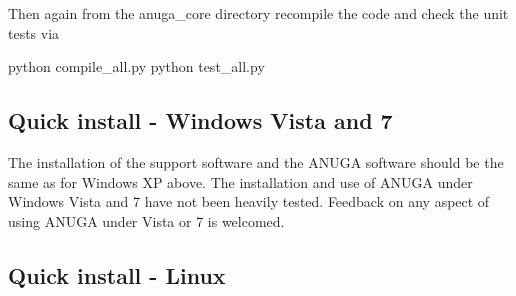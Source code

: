\documentclass{manual}
\begin{document}
Then again from the anuga_core directory recompile the code and check the unit tests via

python compile_all.py
python test_all.py




%




\subsection{Quick install - Windows Vista and 7}
\label{sec:winvista}

The installation of the support software and the ANUGA software should be the same as for Windows XP above.
The installation and use of ANUGA under Windows Vista and 7 have not been heavily tested.  Feedback on any aspect
of using ANUGA under Vista or 7 is welcomed.

\subsection{Quick install - Linux}
\label{sec:linux}
\end{document}
